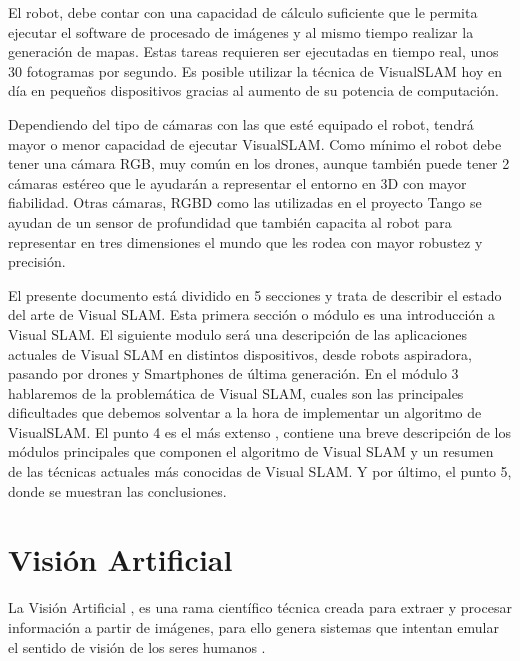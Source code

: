 El robot, debe contar con una capacidad de cálculo suficiente que le permita ejecutar el software de procesado de imágenes y al mismo tiempo realizar la generación de mapas. Estas tareas requieren ser ejecutadas en tiempo real, unos 30 fotogramas por segundo. Es posible utilizar la técnica de VisualSLAM hoy en día en pequeños dispositivos gracias al aumento de su potencia de computación.

Dependiendo del tipo de cámaras con las que esté equipado  el robot,  tendrá mayor o menor capacidad de ejecutar VisualSLAM. Como mínimo el robot debe tener una cámara RGB, muy común en los drones, aunque también puede tener 2 cámaras estéreo que le ayudarán a representar el entorno en 3D con mayor fiabilidad. Otras cámaras, RGBD como las utilizadas en el proyecto Tango se ayudan de un sensor de profundidad que también capacita al robot para representar en tres dimensiones el mundo que les rodea con mayor robustez y precisión.

El presente documento está dividido en 5 secciones y trata de describir el estado del arte de Visual SLAM. Esta primera sección o módulo es una introducción a Visual SLAM. El siguiente modulo será una descripción de las aplicaciones actuales de Visual SLAM en distintos dispositivos, desde robots aspiradora, pasando por drones y Smartphones de última generación. En el módulo 3 hablaremos de la problemática de Visual SLAM, cuales son las principales dificultades que debemos solventar a la hora de implementar un algoritmo de VisualSLAM. El punto 4 es el más extenso , contiene una breve descripción de los módulos principales que componen el algoritmo de Visual SLAM y un resumen de las técnicas actuales más conocidas de Visual SLAM.
Y por último, el punto 5, donde se muestran las conclusiones.

\section{Visión Artificial}
La Visión Artificial , es una rama científico técnica creada para extraer y procesar información a partir de imágenes, para ello genera sistemas que intentan emular el sentido de visión de los seres humanos .

